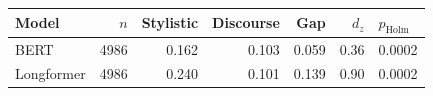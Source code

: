 \begin{tabular}{lrrrrrl}
\toprule
Model & $n$ & Stylistic & Discourse & Gap & $d_z$ & $p_{\text{Holm}}$ \\
\midrule
BERT & 4986 & 0.162 & 0.103 & 0.059 & 0.36 & 0.0002 \\
Longformer & 4986 & 0.240 & 0.101 & 0.139 & 0.90 & 0.0002 \\
\bottomrule
\end{tabular}